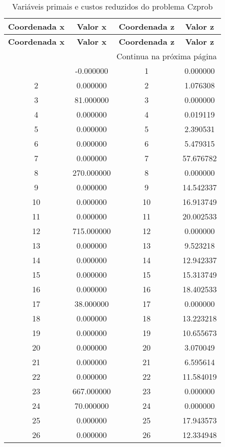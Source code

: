 \documentclass[12pt]{article}
\begin{document}
\begin{longtable}{@{}cccc@{}}
\caption{Variáveis primais e custos reduzidos do problema Czprob} \\
\toprule
\textbf{Coordenada x} & \textbf{Valor x} & \textbf{Coordenada z} & \textbf{Valor z} \\
\midrule
\endfirsthead

\toprule
\textbf{Coordenada x} & \textbf{Valor x} & \textbf{Coordenada z} & \textbf{Valor z} \\
\midrule
\endhead

\midrule \multicolumn{4}{r}{{Continua na próxima página}} \\ \midrule
\endfoot

\bottomrule
\endlastfoot
1 & -0.000000 & 1 & 0.000000 \\
2 & 0.000000 & 2 & 1.076308 \\
3 & 81.000000 & 3 & 0.000000 \\
4 & 0.000000 & 4 & 0.019119 \\
5 & 0.000000 & 5 & 2.390531 \\
6 & 0.000000 & 6 & 5.479315 \\
7 & 0.000000 & 7 & 57.676782 \\
8 & 270.000000 & 8 & 0.000000 \\
9 & 0.000000 & 9 & 14.542337 \\
10 & 0.000000 & 10 & 16.913749 \\
11 & 0.000000 & 11 & 20.002533 \\
12 & 715.000000 & 12 & 0.000000 \\
13 & 0.000000 & 13 & 9.523218 \\
14 & 0.000000 & 14 & 12.942337 \\
15 & 0.000000 & 15 & 15.313749 \\
16 & 0.000000 & 16 & 18.402533 \\
17 & 38.000000 & 17 & 0.000000 \\
18 & 0.000000 & 18 & 13.223218 \\
19 & 0.000000 & 19 & 10.655673 \\
20 & 0.000000 & 20 & 3.070049 \\
21 & 0.000000 & 21 & 6.595614 \\
22 & 0.000000 & 22 & 11.584019 \\
23 & 667.000000 & 23 & 0.000000 \\
24 & 70.000000 & 24 & 0.000000 \\
25 & 0.000000 & 25 & 17.943573 \\
26 & 0.000000 & 26 & 12.334948 \\

\end{longtable}
\end{document}
